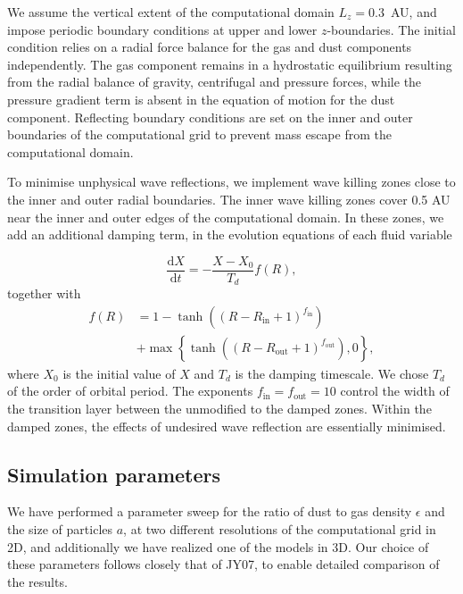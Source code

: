 We assume the vertical extent of the computational domain $L_z = 0.3$~AU, and
impose periodic boundary conditions at upper and lower $z$-boundaries. The
initial condition relies on a radial force balance for the gas and dust
components independently. The gas component remains in a hydrostatic equilibrium
resulting from the radial balance of gravity, centrifugal and pressure forces,
while the pressure gradient term is absent in the equation of motion for the
dust component.  Reflecting boundary conditions are set on the inner and outer
boundaries of the computational grid to prevent mass escape from the
computational domain. 

\par To minimise unphysical wave reflections, we implement wave killing zones
close to the inner and outer radial boundaries. The inner wave killing zones
cover 0.5 AU near the inner and outer edges of the computational domain. In
these zones, we add an additional damping term, in the evolution equations of
each fluid variable

\begin{equation}
  \frac{\textrm{d}X}{\textrm{d}t} = - \frac{X-X_0}{T_d}f(R),
\end{equation}
together with
\begin{equation}
   \begin{split} 
      f(R) &= 1 - \tanh\left(\left(R - R_\textrm{in} + 1
      \right)^{f_\textrm{in}}\right)\\ &+ \max\left\{ \tanh\left(\left(R -
      R_\textrm{out} + 1\right)^{f_\textrm{out}}\right), 0\right\}, 
   \end{split}
\end{equation}
where $X_0$ is the initial value of $X$ and $T_d$ is the damping timescale. We
chose $T_d$ of the order of orbital period.  The exponents
$f_\textrm{in}=f_\textrm{out}=10$ control the width of the transition layer
between the unmodified to the damped zones. Within the damped zones, the effects
of undesired wave reflection are essentially minimised.
%
\subsection{Simulation parameters}
%
We have performed a parameter sweep for the ratio of dust to gas density
$\epsilon$ and the size of particles $a$, at two different resolutions of the
computational grid in 2D, and additionally we have realized one of the models in
3D. Our choice of these parameters follows closely that of JY07, to enable
detailed comparison of the results.

